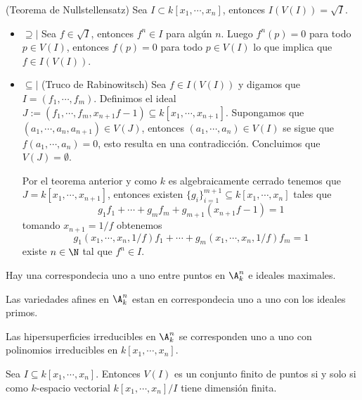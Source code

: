 \documentclass{article}
\begin{document}
\begin{teo}
    (Teorema de Nullstellensatz) Sea $I\subset k[x_{1},\cdots,x_{n}]$, entonces $I(V(I))=\sqrt{I}$.
\end{teo}

\begin{dem} \hspace{4mm}
    \begin{itemize}
        \item $\supseteq|$ Sea $f\in\sqrt{I}$, entonces $f^{n}\in I$ para algún $n$. Luego 
        $f^{n}(p)=0$ para todo $p\in V(I)$, entonces $f(p)=0$ para todo $p\in V(I)$ lo que implica
        que $f\in I(V(I))$.

        \item $\subseteq|$ (Truco de Rabinowitsch) Sea $f\in I(V(I))$ y digamos que 
        $I=(f_{1},\cdots,f_{m})$. Definimos el ideal $J:=(f_{1},\cdots,f_{m},x_{n+1}f-1)
        \subseteq k[x_{1},\cdots,x_{n+1}]$. Supongamos que $(a_{1},\cdots,a_{n},a_{n+1})\in V(J)$,
        entonces $(a_{1},\cdots,a_{n})\in V(I)$ se sigue que $f(a_{1},\cdots,a_{n})=0$, esto 
        resulta en una contradicción. Concluimos que $V(J)=\emptyset$.
        \vspace{4mm}

        \noindent Por el teorema anterior y como $k$ es algebraicamente cerrado tenemos que 
        $J=k[x_{1},\cdots,x_{n+1}]$, entonces existen $\{g_{i}\}_{i=1}^{m+1}\subseteq 
        k[x_{1},\cdots,x_{n}]$ tales que
        \begin{equation*}
            g_{1}f_{1}+\cdots+g_{m}f_{m}+g_{m+1}(x_{n+1}f-1)=1
        \end{equation*}
        tomando $x_{n+1}=1/f$ obtenemos
        \begin{equation*}
            g_{1}(x_{1},\cdots,x_{n},1/f)f_{1}+\cdots+g_{m}(x_{1},\cdots,x_{n},1/f)f_{m}=1
        \end{equation*}
        existe $n\in\N$ tal que $f^{n}\in I$.
    \end{itemize}
\end{dem}

\begin{cor}
    Hay una correspondecia uno a uno entre puntos en $\A_{k}^{n}$ e ideales maximales.
\end{cor}

\begin{cor}
    Las variedades afines en $\A_{k}^{n}$ estan en correspondecia uno a uno con los ideales primos.
\end{cor}

\begin{cor}
    Las hipersuperficies irreducibles en $\A_{k}^{n}$ se corresponden uno a uno con polinomios
    irreducibles en $k[x_{1},\cdots,x_{n}]$.
\end{cor}

\begin{cor}
    Sea $I\subseteq k[x_{1},\cdots,x_{n}]$. Entonces $V(I)$ es un conjunto finito de puntos si y
    solo si como $k$-espacio vectorial $k[x_{1},\cdots,x_{n}]/I$ tiene dimensión finita.
\end{cor}

\end{document}
